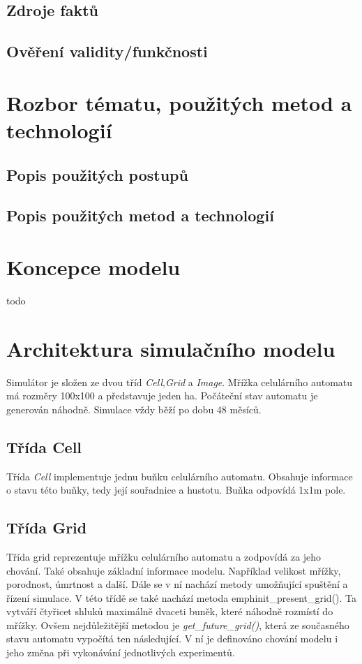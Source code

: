\documentclass[a4paper,11pt]{article}
\begin{document}
\subsection{Zdroje faktů}

\subsection{Ověření validity/funkčnosti}


\section{Rozbor tématu, použitých metod a technologií}
\subsection{Popis použitých postupů}

\subsection{Popis použitých metod a technologií}


\section{Koncepce modelu}
todo

\section{Architektura simulačního modelu}
Simulátor je složen ze dvou tříd \emph{Cell},\emph{Grid} a \emph{Image}. Mřížka celulárního automatu má rozměry 100x100 a představuje jeden ha. Počáteční stav automatu je generován náhodně. Simulace vždy běží po dobu 48 měsíců.

\subsection{Třída Cell}
Třída \emph{Cell} implementuje jednu buňku celulárního automatu. Obsahuje informace o stavu této buňky, tedy její souřadnice a hustotu. Buňka odpovídá 1x1m pole.

\subsection{Třída Grid}
Třída grid reprezentuje mřížku celulárního automatu a zodpovídá za jeho chování. Také obsahuje základní informace modelu. Například velikost mřížky, porodnost, úmrtnost a další. Dále se v ní nachází metody umožňující spuštění a řízení simulace. V této třídě se také nachází metoda emph{init\_present\_grid()}. Ta vytváří čtyřicet shluků maximálně dvaceti buněk, které náhodně rozmístí do mřížky.
Ovšem nejdůležitější metodou je \emph{get\_future\_grid()}, která ze současného stavu automatu vypočítá ten následující. V ní je definováno chování modelu i jeho změna při vykonávání jednotlivých experimentů.
\end{document}
